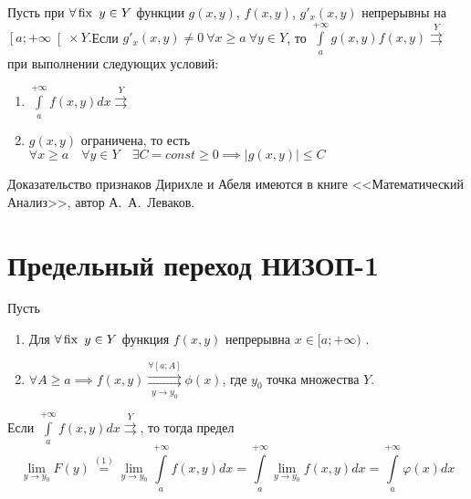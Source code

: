 \documentclass[../../main.tex]{subfiles}
\begin{document}
\begin{thm}

Пусть при $\forall \operatorname{fix} \ y \in Y $ функции $g(x,y)$, $f(x,y)$, $g'_x(x,y)$ 
непрерывны на $\left[a;+\infty\right[\times Y.$Если $ g'_x(x,y) \not = 0\ 
\forall x 
\ge a \ \forall y \in Y $, то $\int\limits_a^{+\infty} g(x,y)f(x,y) 
\overset{Y}{\rightrightarrows}$ при выполнении следующих условий:

\begin{enumerate}
\item $\int\limits_a^{+\infty}f(x,y)dx \overset{Y}{\rightrightarrows}$

\item $g(x,y)$ ограничена, то есть $\forall x \ge a \quad \forall y \in Y 
\quad \exists 
C = 
const \ge 0 \implies \left|g(x,y)\right| \le C $
\end{enumerate}
\end{thm}

Доказательство признаков Дирихле и Абеля имеются в книге <<Математический 
Анализ>>, автор А.~А.~Леваков.


\section{ Предельный переход НИЗОП-1}
\begin{thm}
Пусть

\begin{enumerate}
\item Для $\forall \operatorname{fix} \ y \in Y$ функция $f(x,y)$ непрерывна $x \in 
[a;+\infty)$ 
.
\item $\forall A \ge a \implies f(x,y) \overset{\forall [a;A]}{\underset{y \to 
y_0}{\rightrightarrows}} \phi(x) $, где $y_0$ точка множества $Y$.
\end{enumerate}

Если $\int\limits_a^{+\infty}f(x,y)dx \overset{Y}\rightrightarrows $, то тогда 
предел \begin{equation}\label{lec10:12}
\underset{y \to y_0}\lim F(y) \overset{(1)}= \underset{y \to 
y_0}\lim\int\limits_a^{+\infty}f(x,y)dx =\int\limits_a^{+\infty} \underset{y 
\to y_0}\lim f(x,y)dx = \int\limits_a^{+\infty}\varphi(x)dx \end{equation}
\end{thm}
\end{document}
